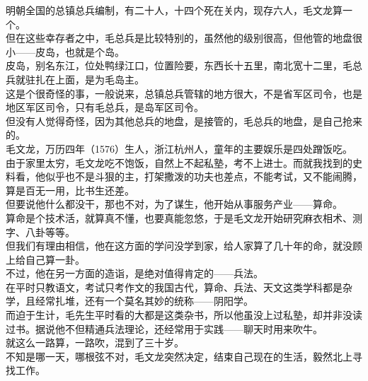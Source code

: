 \begin{multicols}{\theparacolNo}
明朝全国的总镇总兵编制，有二十人，十四个死在关内，现存六人，毛文龙算一个。\\

但在这些幸存者之中，毛总兵是比较特别的，虽然他的级别很高，但他管的地盘很小——皮岛，也就是个岛。\\

皮岛，别名东江，位处鸭绿江口，位置险要，东西长十五里，南北宽十二里，毛总兵就驻扎在上面，是为毛岛主。\\

这是个很奇怪的事，一般说来，总镇总兵管辖的地方很大，不是省军区司令，也是地区军区司令，只有毛总兵，是岛军区司令。\\

但没有人觉得奇怪，因为其他总兵的地盘，是接管的，毛总兵的地盘，是自己抢来的。\\

毛文龙，万历四年（1576）生人，浙江杭州人，童年的主要娱乐是四处蹭饭吃。\\

由于家里太穷，毛文龙吃不饱饭，自然上不起私塾，考不上进士。而就我找到的史料看，他似乎也不是斗狠的主，打架撒泼的功夫也差点，不能考试，又不能闹腾，算是百无一用，比书生还差。\\

但要说他什么都没干，那也不对，为了谋生，他开始从事服务产业——算命。\\

算命是个技术活，就算真不懂，也要真能忽悠，于是毛文龙开始研究麻衣相术、测字、八卦等等。\\

但我们有理由相信，他在这方面的学问没学到家，给人家算了几十年的命，就没顾上给自己算一卦。\\

不过，他在另一方面的造诣，是绝对值得肯定的——兵法。\\

在平时只教语文，考试只考作文的我国古代，算命、兵法、天文这类学科都是杂学，且经常扎堆，还有一个莫名其妙的统称——阴阳学。\\

而迫于生计，毛先生平时看的大都是这类杂书，所以他虽没上过私塾，却并非没读过书。据说他不但精通兵法理论，还经常用于实践——聊天时用来吹牛。\\

就这么一路算，一路吹，混到了三十岁。\\

不知是哪一天，哪根弦不对，毛文龙突然决定，结束自己现在的生活，毅然北上寻找工作。\\


\end{multicols}
